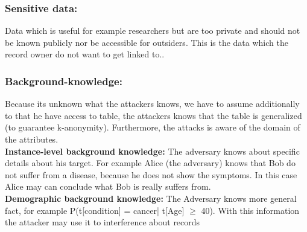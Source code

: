 \documentclass{llncs}
\begin{document}
\subsubsection{Sensitive data:}
Data which is useful for example researchers but are too private and should not be known publicly nor be accessible for outsiders. This is the data which the record owner do not want to get linked to.\cite{ldiversity}.

\subsubsection{Background-knowledge:}
Because its unknown what the attackers knows, we have to assume additionally to that he have access to table, the attackers knows that the table is generalized (to guarantee k-anonymity). Furthermore, the attacks is aware of the domain of the attributes.\\
\textbf{Instance-level background knowledge:}
The adversary knows about specific details about his target. For example Alice (the adversary) knows that Bob do not suffer from a disease, because he does not show the symptoms. In this case Alice may can conclude what Bob is really suffers from.\\
\textbf{Demographic background knowledge:}
The Adversary knows more general fact, for example P(t[condition] = cancer| t[Age] $\geq$ 40). With this information the attacker may use it to interference about records \cite{ldiversity}
\end{document}
